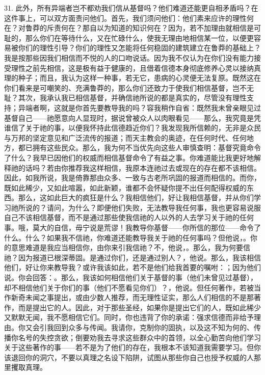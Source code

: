 31. 此外，所有异端者岂不都劝我们信从基督吗？他们难道还能更自相矛盾吗？在这件事上，可以双方面责问他们。首先，我们须问他们：他们素来应许的理性何在？对鲁莽的斥责何在？那自以为知道的知识何在？因为，若不加理由就相信是可耻的，那么你们在等待什么，又在忙碌什么，使我无理由地相信某一位，以便更容易被你们的理性引导？你们的理性又怎能将任何稳固的建筑建立在鲁莽的基础上？我是按那些因我们相信而不悦的人的口吻说话。因为我不仅认为在你们没有能力接受理性之前先相信，这是极有益于健康的，且借着信德本身彻底修养心灵以接纳真理的种子；而且，我认为这样一种事，若无它，患病的心灵便无法复原。既然这在你们看来是可嘲笑的、充满鲁莽的，那么你们还致力于使我们相信基督，岂不无耻？其次，我承认我已相信基督，并确信祂所说的都是真实的，尽管没有理性支持；异端者啊，这就是你首先要教导我的吗？容我稍作自省：既然我未曾亲眼见过基督自己——祂愿意向人显现时，据说曾被众人以肉眼看见——那么，我究竟是凭谁信了关于祂的事，以便我怀持此信德趋近你们？我发现我所信赖的，无非是众民与万邦的坚定意见和广泛流传的报道；而天主教会的奥迹，在任何时代、任何地方，都已拥有这些民众。那么，我为何不当优先向这些人审慎查明：基督究竟命令了什么？我早已因他们的权威而相信基督命令了有益之事。你难道能比我更好地解释祂的话吗？若由你推荐我这样相信，我原本连祂过去或现在的存在都不该相信。因此，如我所说，我是倚靠那由众多、一致与古老所巩固的报道而相信的。而你，既如此稀少，又如此喧嚣，如此新颖，谁都不会怀疑你提不出任何配得权威的东西。那么，这如此巨大的疯狂是什么？我相信他们，好让我相信基督，并从你们学习祂所说的？请问，为什么？即便他们失败，无法教导我任何事，我也更容易说服自己不该相信基督，而不是通过那些使我信祂的人以外的人去学习关于祂的任何事。哦，莫大的自信，毋宁说是荒谬！我教导你基督——你所信的那位——命令了什么。什么？如果我不信祂，你难道还能教导我关于祂的任何事吗？但他说，。你的意思难道是我应当相信你，由你来引我信祂？不，他说，。那么，我为何要信祂？因为报道已根深蒂固。是通过你们，还是通过别人？，他说。那么，我该相信他们，好让你来教导我？或许我该如此，若不是他们给我首要的嘱咐：；因为他们说。你会回答：。那么，我该如何相信他们关于基督的事（他们未曾见过基督），却不相信他们关于你们的事（他们不愿看见你们）？，他说。但任何著作，若被当作新奇未闻之事提出，或由少数人推荐，而无理性证实，那么人们相信的不是那著作，而是提出它的人。因此，对于那些圣经，如果你是提出它们的人，既如此稀少又默默无闻，我不愿相信它们。同时，你也违背了你的承诺：强求信德而非给予理由。你又会引我回到众多与传闻。我请你，克制你的固执，以及这不知为何的、传播你名号的失控贪欲；倒要劝我去寻求这些群众中的首领，以全心勤苦向他们学习关于这些著作的事——若不是为了他们的存在，我根本不该知道我需要学习。但你该退回你的洞穴，不要以真理之名设下陷阱，试图从那些你自己也授予权威的人那里攫取真理。\par

